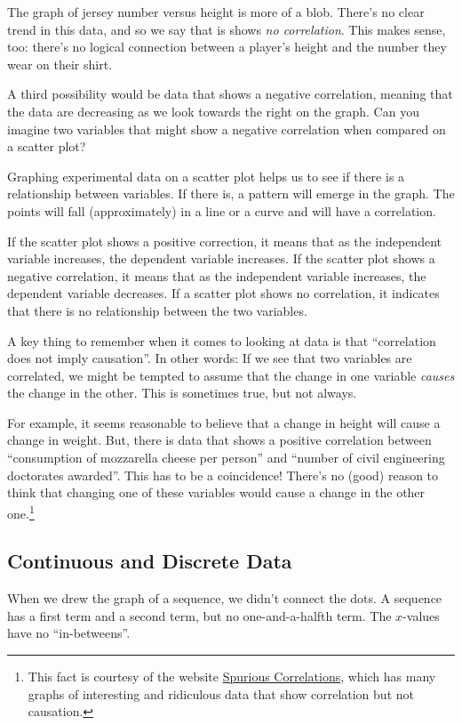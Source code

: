 The graph of jersey number versus height is more of a blob. There's no clear trend in this data, and so we say that is shows \textit{no correlation}. This makes sense, too: there's no logical connection between a player's height and the number they wear on their shirt.

A third possibility would be data that shows a negative correlation, meaning that the data are decreasing as we look towards the right on the graph. Can you imagine two variables that might show a negative correlation when compared on a scatter plot?

Graphing experimental data on a scatter plot helps us to see if there is a relationship between variables. If there is, a pattern will emerge in the graph. The points will fall (approximately) in a line or a curve and will have a correlation.

If the scatter plot shows a positive correction, it means that as the independent variable increases, the dependent variable increases. If the scatter plot shows a negative correlation, it means that as the independent variable increases, the dependent variable decreases. If a scatter plot shows no correlation, it indicates that there is no relationship between the two variables.

A key thing to remember when it comes to looking at data is that ``correlation does not imply causation''. In other words: If we see that two variables are correlated, we might be tempted to assume that the change in one variable \textit{causes} the change in the other. This is sometimes true, but not always.

For example, it seems reasonable to believe that a change in height will cause a change in weight. But, there is data that shows a positive correlation between ``consumption of mozzarella cheese per person'' and ``number of civil engineering doctorates awarded''. This has to be a coincidence! There's no (good) reason to think that changing one of these variables would cause a change in the other one.\footnote{This fact is courtesy of the website \href{http://www.tylervigen.com/view_correlation?id=3890}{Spurious Correlations}, which has many graphs of interesting and ridiculous data that show correlation but not causation.}

\subsection{Continuous and Discrete Data}

When we drew the graph of a sequence, we didn't connect the dots. A sequence has a first term and a second term, but no one-and-a-halfth term. The $x$-values have no ``in-betweens''.

